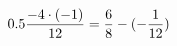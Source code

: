 \documentclass[preview]{standalone}
\begin{document}
\begin{align*}
\special{dvisvgm:raw <g id='unique000'>}0.5 \frac{-4 \cdot (-1)}{12} = \frac{6}{8} - (- \frac{1}{12})\special{dvisvgm:raw </g>}
\end{align*}
\end{document}

